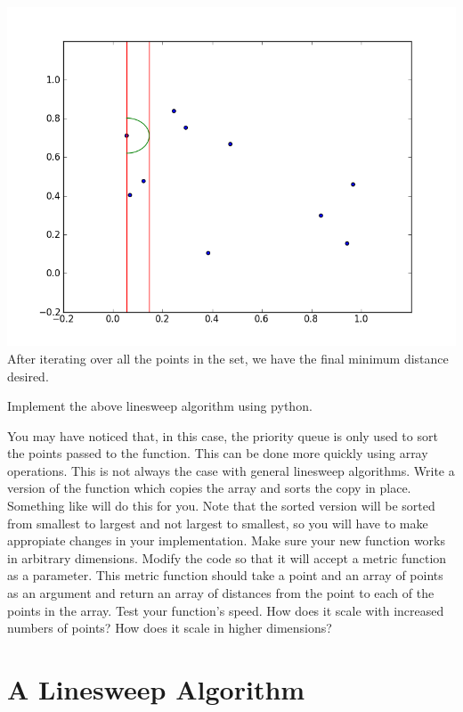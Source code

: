 \includegraphics[width = \textwidth]{simple8.png}
After iterating over all the points in the set, we have the final minimum distance desired.

\begin{problem}
Implement the above linesweep algorithm using python.
\end{problem}

\begin{problem}
You may have noticed that, in this case, the priority queue is only used to sort the points passed to the function. 
This can be done more quickly using array operations. 
This is not always the case with general linesweep algorithms. 
Write a version of the function which copies the array and sorts the copy in place. 
Something like  will do this for you. 
Note that the sorted version will be sorted from smallest to largest and not largest to smallest, so you will have to make appropiate changes in your implementation.
Make sure your new function works in arbitrary dimensions. 
Modify the code so that it will accept a metric function as a parameter. 
This metric function should take a point and an array of points as an argument and return an array of distances from the point to each of the points in the array. 
Test your function's speed. 
How does it scale with increased numbers of points? 
How does it scale in higher dimensions?
\end{problem}

\section*{A Linesweep Algorithm}

